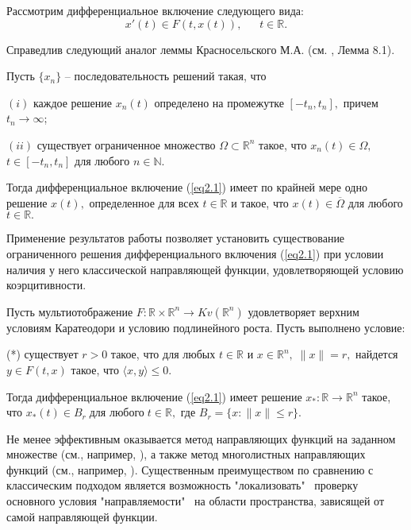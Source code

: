 Рассмотрим диф\-ференциальное включение следующего вида:
\begin{equation}
\label{eq2.1}
x'(t)\in F(t,x(t)),\quad\;\;t\in\mathbb{R}.
\end{equation}

Справедлив следующий аналог леммы Красносельского М.А. (см. \cite{k_kr}, Лемма 8.1).

\begin{lemma}
Пусть $\{x_n\}$ -- последовательность решений  такая, что

$(i)$  каждое решение $x_n(t)$ определено на промежутке $[-t_n, t_n],$ причем $t_n\to \infty$;

$(ii)$ существует ограниченное множество $\Omega\subset \mathbb{R}^n$ такое, что $x_n(t)\in\Omega,$ $t\in[-t_n,t_n]$ для любого $n\in \mathbb{N}.$

Тогда дифференциальное включение (\ref{eq2.1}) имеет по крайней мере одно решение $x(t),$ определенное для всех $t\in \mathbb{R}$ и такое, что $x(t)\in\overline{\Omega}$ для любого $t\in \mathbb{R}.$
\end{lemma}

Применение результатов работы \cite{o_k_k} позволяет установить существование ограниченного решения диф\-ференциального включения (\ref{eq2.1}) при условии наличия у него классической направляющей функции, удовлетворяющей условию коэрцитивности.

\begin{theorem}
Пусть мультиотображение $F:\mathbb{R} \times \mathbb{R}^n \to Kv(\mathbb{R}^n)$ удовлетворяет верхним условиям Каратеодори и условию подлинейного роста. Пусть выполнено условие:

(*) существует $r>0$ такое, что для любых $t\in \mathbb{R}$ и $x \in \mathbb{R}^n, \; \|x\|=r,$ найдется $y\in F(t,x)$ такое, что
$
\langle x, y \rangle\leq 0.
$

Тогда дифференциальное включение (\ref{eq2.1}) имеет решение $x_*:\mathbb{R}\to \mathbb{R}^n$ такое, что
$
x_*(t)\in B_r \;\mbox{для любого} \; t\in\mathbb{R},
$
где $B_r=\{x:\|x\|\leq r\}.$
\end{theorem}

Не менее эффективным оказывается метод направляющих функций на заданном множестве (см., например, \cite{k_k_o}), а также метод многолистных направляющих функций (см., например, \cite{k_k_o_z_2}). Существенным преимуществом по сравнению с классическим подходом является возможность "локализовать" $\,$ проверку основного условия "направляемости" $\,$ на области пространства, зависящей от самой направляющей функции.


